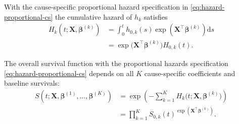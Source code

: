\documentclass[11pt]{article}
\newcommand{\X}{\mathbf{X}}
\renewcommand{\b}{\bm{\beta}}
\renewcommand{\d}{\text{d}}
\begin{document}
With the cause-specific proportional hazard specification in \eqref{eq:hazard-proportional-cs} the cumulative hazard of $h_k$ satisfies
\begin{equation*}
\begin{split}
    H_k\left(t ; \X, \b^{(k)}\right) &= \int^t_0 h_{0,k}(s) \exp \left(\X^\top \b^{(k)} \right) \d s
    \\
    &= \exp \big(\X^\top \b^{(k)} \big) H_{0,k}(t).
\end{split}
\end{equation*}

The overall survival function with the proportional hazards specification \eqref{eq:hazard-proportional-cs} depends on all $K$ cause-specific coefficients and baseline survivals:
\begin{equation}\label{eq:cox-survival-cs}
\begin{split}
	S\left( t ; \X, \b^{(1)}, \dots, \b^{(K)}\right)
	&=
	\exp\left( - \sum_{k=1}^K H_k\Big(t ; \X, \b^{(k)}\Big) \right)
	\\
	&=
	\prod_{k=1}^K S_{0,k}(t)^{\exp\left( \X^\top \b^{(k)} \right)}.
\end{split}
\end{equation}
  
\end{document}
